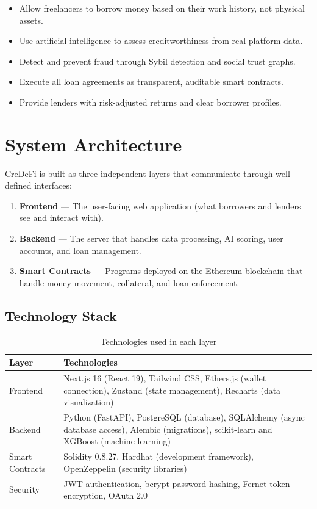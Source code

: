 \documentclass[12pt, a4paper]{article}
\begin{document}
\begin{itemize}[nosep]
    \item Allow freelancers to borrow money based on their work history, not physical assets.
    \item Use artificial intelligence to assess creditworthiness from real platform data.
    \item Detect and prevent fraud through Sybil detection and social trust graphs.
    \item Execute all loan agreements as transparent, auditable smart contracts.
    \item Provide lenders with risk-adjusted returns and clear borrower profiles.
\end{itemize}


\section{System Architecture}

CreDeFi is built as three independent layers that communicate through well-defined interfaces:

\begin{enumerate}[nosep]
    \item \textbf{Frontend} --- The user-facing web application (what borrowers and lenders see and interact with).
    \item \textbf{Backend} --- The server that handles data processing, AI scoring, user accounts, and loan management.
    \item \textbf{Smart Contracts} --- Programs deployed on the Ethereum blockchain that handle money movement, collateral, and loan enforcement.
\end{enumerate}

\subsection{Technology Stack}

\begin{table}[H]
\centering
\caption{Technologies used in each layer}
\begin{tabularx}{\textwidth}{l X}
\toprule
\textbf{Layer} & \textbf{Technologies} \\
\midrule
Frontend & Next.js 16 (React 19), Tailwind CSS, Ethers.js (wallet connection), Zustand (state management), Recharts (data visualization) \\
\addlinespace
Backend & Python (FastAPI), PostgreSQL (database), SQLAlchemy (async database access), Alembic (migrations), scikit-learn and XGBoost (machine learning) \\
\addlinespace
Smart Contracts & Solidity 0.8.27, Hardhat (development framework), OpenZeppelin (security libraries) \\
\addlinespace
Security & JWT authentication, bcrypt password hashing, Fernet token encryption, OAuth 2.0 \\
\bottomrule
\end{tabularx}
\end{table}
\end{document}
